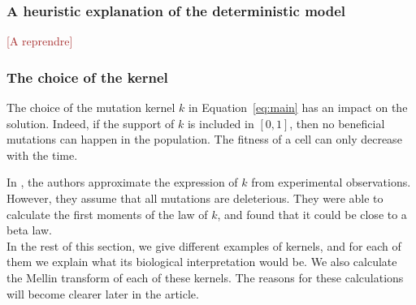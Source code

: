 \documentclass[11pt]{amsart}
\newcommand{\ndr}[1]{\textcolor{brown}{[#1]}}
\begin{document}


   \subsubsection{A heuristic explanation of the deterministic model}\ndr{A reprendre}


    \subsubsection{The choice of the kernel}

    The choice of the mutation kernel $k$ in Equation~\eqref{eq:main} has an impact on the solution. Indeed, if the support of $k$ is included in $[0, 1]$, then no beneficial mutations can happen in the population. The fitness of a cell can only decrease with the time. 

    In \cite{robert2018mutation}, the authors approximate the expression of $k$ from experimental observations. However, they assume that all mutations are deleterious. They were able to calculate the first moments of the law of $k$, and found that it could be close to a beta law. \\

    In the rest of this section, we give different examples of kernels, and for each of them we explain what its biological interpretation would be. We also calculate the Mellin transform of each of these kernels. The reasons for these calculations will become clearer later in the article. \\
\end{document}
